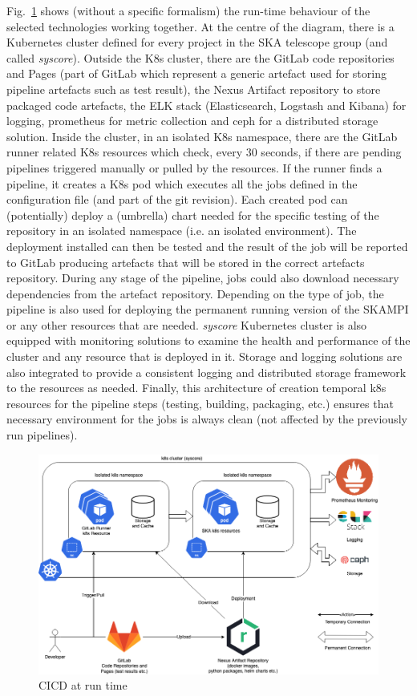 \documentclass[a4paper]{spie}  %
\begin{document}
Fig.~\ref{fig:cicdruntime} shows (without a specific formalism) the run-time behaviour of the selected technologies working together. At the centre of the diagram, there is a Kubernetes cluster defined for every project in the SKA telescope group (and called \textit{syscore}). Outside the K8s cluster, there are the GitLab code repositories and Pages\cite{gitlab} (part of GitLab which represent a generic artefact used for storing pipeline artefacts such as test result), the Nexus Artifact repository\cite{nexus} to store packaged code artefacts, the ELK stack (Elasticsearch, Logstash and Kibana)\cite{elastcsearch} for logging, prometheus\cite{prometheus} for metric collection and ceph\cite{ceph} for a distributed storage solution. 
Inside the cluster, in an isolated K8s namespace, there are the GitLab runner related K8s resources which check, every 30 seconds, if there are pending pipelines triggered manually or pulled by the resources.  If the runner finds a pipeline, it creates a K8s pod which executes all the jobs defined in the configuration file (and part of the git revision). Each created pod can (potentially) deploy a (umbrella) chart needed for the specific testing of the repository in an isolated namespace (i.e. an isolated environment). The deployment installed can then be tested and the result of the job will be reported to GitLab producing artefacts that will be stored in the correct artefacts repository. During any stage of the pipeline, jobs could also download necessary dependencies from the artefact repository. Depending on the type of job, the pipeline is also used for deploying the permanent running version of the SKAMPI or any other resources that are needed. \textit{syscore} Kubernetes cluster is also equipped with monitoring solutions to examine the health and performance of the cluster and any resource that is deployed in it. Storage and logging solutions are also integrated to provide a consistent logging and distributed storage framework to the resources as needed. Finally, this architecture of creation temporal k8s resources for the pipeline steps (testing, building, packaging, etc.) ensures that necessary environment for the jobs is always clean (not affected by the previously run pipelines).

\begin{figure}[!htb]
   \centering
   \includegraphics*[width=0.8\columnwidth]{cicdruntime-v2}
   \caption{CICD at run time}
   \label{fig:cicdruntime}
\end{figure}
\end{document}
